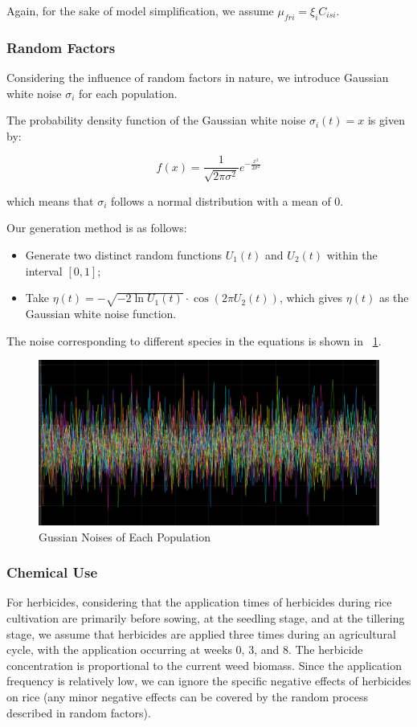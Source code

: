\documentclass{HZNUMCM}
\begin{document}
        Again, for the sake of model simplification, we assume \( \mu_{fri} = \xi_{i} C_{isi} \).
      \subsubsection{Random Factors}
        Considering the influence of random factors in nature, we introduce Gaussian white noise \(\sigma_i\) for each population.

        The probability density function of the Gaussian white noise \(\sigma_i(t) = x\) is given by:

        \begin{equation}
        f(x) = \frac{1}{\sqrt{2\pi\sigma^2}} e^{-\frac{x^2}{2\sigma^2}}
        \end{equation}

        which means that \(\sigma_i\) follows a normal distribution with a mean of 0.
        
        Our generation method is as follows:
        \begin{itemize}
            \item Generate two distinct random functions \(U_1(t)\) and \(U_2(t)\) within the interval \([0, 1]\);
            \item Take \(\eta(t) = -\sqrt{-2 \ln U_1(t)} \cdot \cos(2\pi U_2(t))\), which gives \(\eta(t)\) as the Gaussian white noise function.
        \end{itemize}
        The noise corresponding to different species in the equations is shown in \figurename~\ref{fig:GussianNoise}.
        \begin{figure}[H]
          \centering
          \includegraphics[width=0.8\linewidth]{images/GussianNoise.png}
          \caption{Gussian Noises of Each Population}
          \label{fig:GussianNoise}
        \end{figure}
      \subsubsection{Chemical Use}
        For herbicides, considering that the application times of herbicides during rice cultivation are primarily before sowing, 
        at the seedling stage, and at the tillering stage, we assume that herbicides are applied three times during an agricultural cycle, 
        with the application occurring at weeks 0, 3, and 8. The herbicide concentration is proportional to the current weed biomass. 
        Since the application frequency is relatively low, we can ignore the specific negative effects of herbicides on rice 
        (any minor negative effects can be covered by the random process described in random factors).
\end{document}
